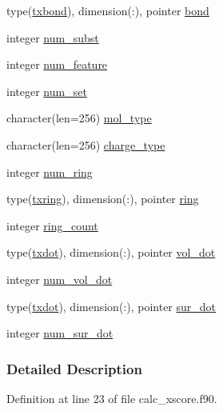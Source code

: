 \begin{DoxyCompactItemize}
\item 
type(\hyperlink{structcalc__xscore_1_1txbond}{txbond}), dimension(\-:), pointer \hyperlink{structcalc__xscore_1_1txmolecule_a1a49cf58dc69e094e7ee33bb94b558c9}{bond}
\item 
integer \hyperlink{structcalc__xscore_1_1txmolecule_a2db69a783b40d7bd6bb08c39be8c058b}{num\-\_\-subst}
\item 
integer \hyperlink{structcalc__xscore_1_1txmolecule_abbc3cce0588bf7f5de6d5375b66ac7be}{num\-\_\-feature}
\item 
integer \hyperlink{structcalc__xscore_1_1txmolecule_a5a46773ef3bec23d00456df4e3486c92}{num\-\_\-set}
\item 
character(len=256) \hyperlink{structcalc__xscore_1_1txmolecule_a1dd0126a97ae9b645f38901a331f22ba}{mol\-\_\-type}
\item 
character(len=256) \hyperlink{structcalc__xscore_1_1txmolecule_abe711a08b549133ec39b45072d6547d8}{charge\-\_\-type}
\item 
integer \hyperlink{structcalc__xscore_1_1txmolecule_a045d6f7b6e85e61131889e8ec6bda8de}{num\-\_\-ring}
\item 
type(\hyperlink{structcalc__xscore_1_1txring}{txring}), dimension(\-:), pointer \hyperlink{structcalc__xscore_1_1txmolecule_a676b618c6fa68c2b77730c195ee02a80}{ring}
\item 
integer \hyperlink{structcalc__xscore_1_1txmolecule_a22b4e6360122102635dce71bd4a4ea44}{ring\-\_\-count}
\item 
type(\hyperlink{structcalc__xscore_1_1txdot}{txdot}), dimension(\-:), pointer \hyperlink{structcalc__xscore_1_1txmolecule_a9e2cebdf3048e808f2f1f7610a75a031}{vol\-\_\-dot}
\item 
integer \hyperlink{structcalc__xscore_1_1txmolecule_ab5edd7dbcd61d941d30585d1257aeb30}{num\-\_\-vol\-\_\-dot}
\item 
type(\hyperlink{structcalc__xscore_1_1txdot}{txdot}), dimension(\-:), pointer \hyperlink{structcalc__xscore_1_1txmolecule_ae94a8a9dc958348e8601ba97b6a194bb}{sur\-\_\-dot}
\item 
integer \hyperlink{structcalc__xscore_1_1txmolecule_ae7b38342a6bc87040cde6f29865c88b1}{num\-\_\-sur\-\_\-dot}
\end{DoxyCompactItemize}


\subsubsection{Detailed Description}


Definition at line 23 of file calc\-\_\-xscore.\-f90.



